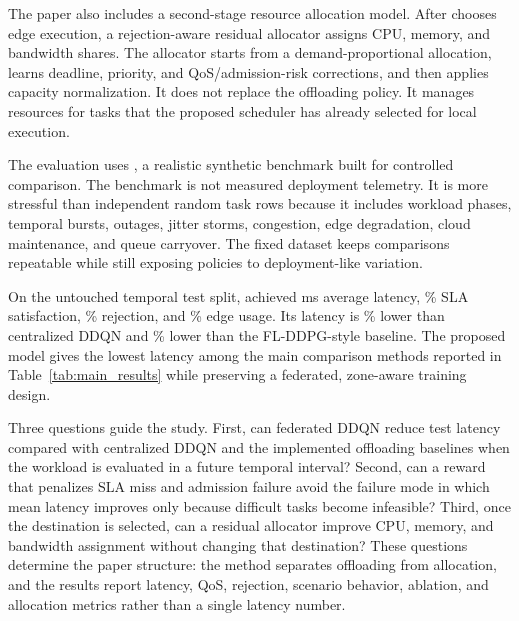 The paper also includes a second-stage resource allocation model. After \fedddqn{} chooses edge execution, a rejection-aware residual allocator assigns CPU, memory, and bandwidth shares. The allocator starts from a demand-proportional allocation, learns deadline, priority, and QoS/admission-risk corrections, and then applies capacity normalization. It does not replace the offloading policy. It manages resources for tasks that the proposed scheduler has already selected for local execution.

The evaluation uses \dataset{}, a realistic synthetic benchmark built for controlled comparison. The benchmark is not measured deployment telemetry. It is more stressful than independent random task rows because it includes workload phases, temporal bursts, outages, jitter storms, congestion, edge degradation, cloud maintenance, and queue carryover. The fixed dataset keeps comparisons repeatable while still exposing policies to deployment-like variation.

On the untouched temporal test split, \fedddqn{} achieved \FedLatency{} ms average latency, \FedSLA\% SLA satisfaction, \FedRejection\% rejection, and \FedEdgeUse\% edge usage. Its latency is \FedVsDDQN\% lower than centralized DDQN and \FedVsFLDDPG\% lower than the FL-DDPG-style baseline. The proposed model gives the lowest latency among the main comparison methods reported in Table~\ref{tab:main_results} while preserving a federated, zone-aware training design.

Three questions guide the study. First, can federated DDQN reduce test latency compared with centralized DDQN and the implemented offloading baselines when the workload is evaluated in a future temporal interval? Second, can a reward that penalizes SLA miss and admission failure avoid the failure mode in which mean latency improves only because difficult tasks become infeasible? Third, once the destination is selected, can a residual allocator improve CPU, memory, and bandwidth assignment without changing that destination? These questions determine the paper structure: the method separates offloading from allocation, and the results report latency, QoS, rejection, scenario behavior, ablation, and allocation metrics rather than a single latency number.

